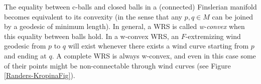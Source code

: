 \documentclass[reqno,10pt]{amsart}
\newcommand{\R}{\mathds R}
\begin{document}
The equality between c-balls and closed balls in a (connected) Finslerian 
manifold becomes equivalent to its  convexity (in the sense that any $p,q
\in M$ can be joined by a geodesic of minimum length). In general,  a WRS is 
called {\em w-convex} when this equality between balls hold. In a w-convex WRS,  an $F$-extremizing wind geodesic 
from $p$ to $q$ will  exist whenever there exists a
wind curve starting from $p$ and ending at $q$. %
A complete WRS is always w-convex, and even 
in this case some of their points might be non-connectable through wind curves
(see Figure \ref{Randers-KropinaFig}).
\end{document}
